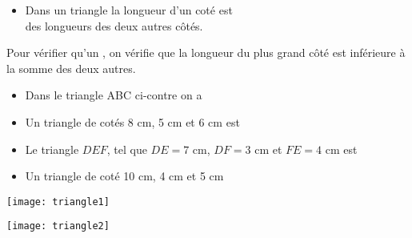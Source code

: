 \begin{myprop}
	\begin{itemize}
		\item Dans un triangle la longueur d'un coté est \\ \hspace*{6cm} des longueurs des deux autres côtés.
		
	\end{itemize}
	
\end{myprop}

\begin{mymeth}
	Pour vérifier qu'un \hspace*{6cm}, on vérifie que la longueur du plus grand côté  est inférieure à la somme des deux autres.
\end{mymeth}

\begin{myexs}
	\begin{multicols}{2}
		\begin{itemize}
			\item Dans le triangle ABC ci-contre on a %
			\item Un triangle de cotés 8 cm, 5 cm et 6 cm est %
			
			\item Le triangle $DEF$, tel que $DE = 7$ cm, $DF = 3$ cm et $FE = 4$ cm est  %
			\vspace*{1cm}
			\item Un triangle de coté 10 cm, 4 cm et 5 cm %
		\end{itemize}
		
		
		\begin{center}
			\texttt{[image: triangle1]}
		
		\texttt{[image: triangle2]}
		\end{center}
	\end{multicols}
\end{myexs}

